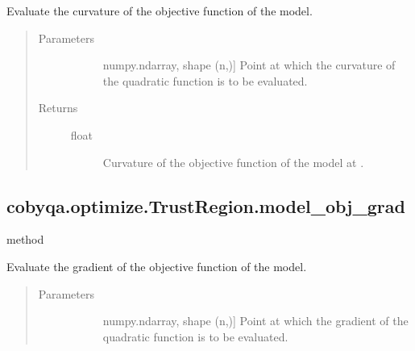 \documentclass[letterpaper,10pt,english]{sphinxmanual}
\begin{document}
\begin{fulllineitems}
\begin{fulllineitems}
\label{\detokenize{refs/generated/cobyqa.optimize.TrustRegion.model_obj_curv:cobyqa.optimize.TrustRegion.model_obj_curv}}
\sphinxAtStartPar
Evaluate the curvature of the objective function of the model.
\begin{quote}\begin{description}
\item[{Parameters}] \leavevmode\begin{description}
\item[{}] \leavevmode{[}numpy.ndarray, shape (n,){]}
\sphinxAtStartPar
Point at which the curvature of the quadratic function is to be
evaluated.

\end{description}

\item[{Returns}] \leavevmode\begin{description}
\item[{float}] \leavevmode
\sphinxAtStartPar
Curvature of the objective function of the model at .

\end{description}

\end{description}\end{quote}

\end{fulllineitems}



\subsection{cobyqa.optimize.TrustRegion.model\_obj\_grad}
\label{\detokenize{refs/generated/cobyqa.optimize.TrustRegion.model_obj_grad:cobyqa-optimize-trustregion-model-obj-grad}}\label{\detokenize{refs/generated/cobyqa.optimize.TrustRegion.model_obj_grad::doc}}
\sphinxAtStartPar
method

\begin{fulllineitems}
\label{\detokenize{refs/generated/cobyqa.optimize.TrustRegion.model_obj_grad:cobyqa.optimize.TrustRegion.model_obj_grad}}
\sphinxAtStartPar
Evaluate the gradient of the objective function of the model.
\begin{quote}\begin{description}
\item[{Parameters}] \leavevmode\begin{description}
\item[{}] \leavevmode{[}numpy.ndarray, shape (n,){]}
\sphinxAtStartPar
Point at which the gradient of the quadratic function is to be
evaluated.


\end{description}
\end{description}
\end{quote}
\end{fulllineitems}
\end{fulllineitems}
\end{document}

